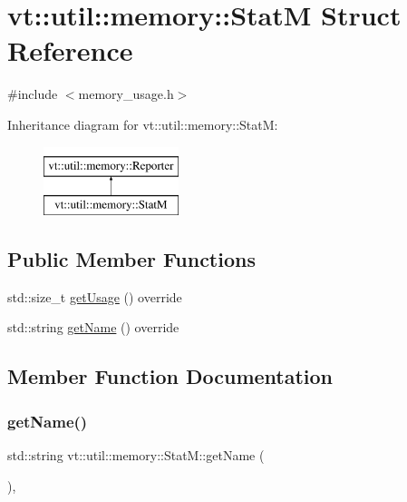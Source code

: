 \hypertarget{structvt_1_1util_1_1memory_1_1_stat_m}{}\section{vt\+:\+:util\+:\+:memory\+:\+:StatM Struct Reference}
\label{structvt_1_1util_1_1memory_1_1_stat_m}


{\ttfamily \#include $<$memory\+\_\+usage.\+h$>$}

Inheritance diagram for vt\+:\+:util\+:\+:memory\+:\+:StatM\+:\begin{figure}[H]
\begin{center}
\leavevmode
\includegraphics[height=2.000000cm]{structvt_1_1util_1_1memory_1_1_stat_m}
\end{center}
\end{figure}
\subsection*{Public Member Functions}
\begin{DoxyCompactItemize}
\item 
std\+::size\+\_\+t \hyperlink{structvt_1_1util_1_1memory_1_1_stat_m_a066c740a52e05e7184dfff530ed07173}{get\+Usage} () override
\item 
std\+::string \hyperlink{structvt_1_1util_1_1memory_1_1_stat_m_ad8ea55e89ec3c591348a26b670048814}{get\+Name} () override
\end{DoxyCompactItemize}


\subsection{Member Function Documentation}
\mbox{\label{structvt_1_1util_1_1memory_1_1_stat_m_ad8ea55e89ec3c591348a26b670048814}} 
\subsubsection{\texorpdfstring{get\+Name()}{getName()}}
{\footnotesize\ttfamily std\+::string vt\+::util\+::memory\+::\+Stat\+M\+::get\+Name (\begin{DoxyParamCaption}{ }\end{DoxyParamCaption})\hspace{0.3cm}{\ttfamily [override]}, {\ttfamily [virtual]}}



